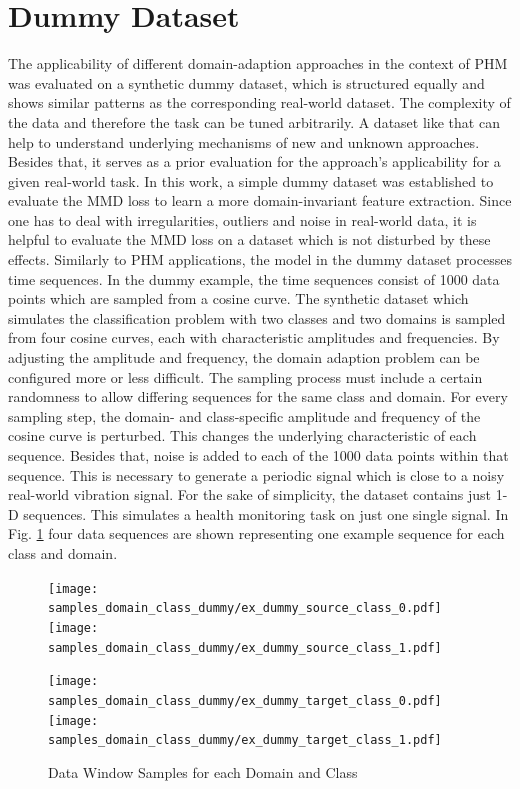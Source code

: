 \section{Dummy Dataset}
The applicability of different domain-adaption approaches in the context of PHM was evaluated on a synthetic dummy dataset, which is structured equally and shows similar patterns as the corresponding real-world dataset. The complexity of the data and therefore the task can be tuned arbitrarily. A dataset like that can help to understand underlying mechanisms of new and unknown approaches. Besides that, it serves as a prior evaluation for the approach's applicability for a given real-world task. In this work, a simple dummy dataset was established to evaluate the MMD loss to learn a more domain-invariant feature extraction. Since one has to deal with irregularities, outliers and noise in real-world data, it is helpful to evaluate the MMD loss on a dataset which is not disturbed by these effects. Similarly to PHM applications, the model in the dummy dataset processes time sequences. In the dummy example, the time sequences consist of 1000 data points which are sampled from a cosine  curve. The synthetic dataset which simulates the classification problem with two classes and two domains is sampled from four cosine  curves, each with characteristic amplitudes and frequencies. By adjusting the amplitude and frequency, the domain adaption problem can be configured more or less difficult. The sampling process must include a certain randomness to allow differing sequences for the same class and domain. For every sampling step, the domain- and class-specific amplitude and frequency of the cosine  curve is perturbed. This changes the underlying characteristic of each sequence. Besides that, noise is added to each of the 1000 data points within that sequence. This is necessary to generate a periodic signal which is close to a noisy real-world vibration signal. For the sake of simplicity, the dataset contains just 1-D sequences. This simulates a health monitoring task on just one single signal. In Fig. \ref{fig:samples_domain_class_dummy} four data sequences are shown representing one example sequence for each class and domain. 

\begin{figure}[H]
  \centering
  \texttt{[image: samples\_domain\_class\_dummy/ex\_dummy\_source\_class\_0.pdf]}
  \hspace{.3cm}
  \texttt{[image: samples\_domain\_class\_dummy/ex\_dummy\_source\_class\_1.pdf]}

  \vspace{.1cm}

  \texttt{[image: samples\_domain\_class\_dummy/ex\_dummy\_target\_class\_0.pdf]}
  \hspace{.3cm}
  \texttt{[image: samples\_domain\_class\_dummy/ex\_dummy\_target\_class\_1.pdf]}

  \caption{Data Window Samples for each Domain and Class}
  \label{fig:samples_domain_class_dummy}
\end{figure}



